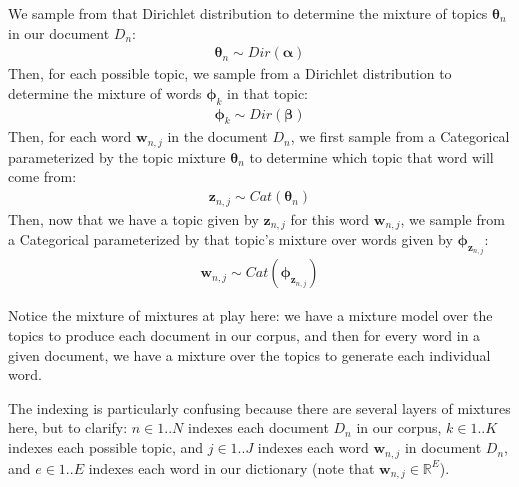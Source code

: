
We sample from that Dirichlet distribution to determine the mixture of topics $\boldsymbol{\theta}_n$ in our document $D_n$:
\begin{align*}
    \boldsymbol{\theta}_n \sim Dir(\boldsymbol{\alpha})
\end{align*}
Then, for each possible topic, we sample from a Dirichlet distribution to determine the mixture of words $\boldsymbol{\phi}_k$ in that topic:
\begin{align*}
    \boldsymbol{\phi}_k \sim Dir(\boldsymbol{\beta})
\end{align*}
Then, for each word $\textbf{w}_{n, j}$ in the document $D_n$, we first sample from a Categorical parameterized by the topic mixture $\boldsymbol{\theta}_n$ to determine which topic that word will come from:
\begin{align*}
    \textbf{z}_{n, j} \sim Cat(\boldsymbol{\theta}_n)
\end{align*}
Then, now that we have a topic given by $\textbf{z}_{n, j}$ for this word $\textbf{w}_{n, j}$, we sample from a Categorical parameterized by that topic's mixture over words given by $\boldsymbol{\phi}_{\textbf{z}_{n, j}}$:
\begin{align*}
    \textbf{w}_{n, j} \sim Cat(\boldsymbol{\phi}_{\textbf{z}_{n, j}})
\end{align*}

Notice the mixture of mixtures at play here: we have a mixture model over the topics to produce each document in our corpus, and then for every word in a given document, we have a mixture over the topics to generate each individual word.

The indexing is particularly confusing because there are several layers of mixtures here, but to clarify: $n \in 1..N$ indexes each document $D_n$ in our corpus, $k \in 1..K$ indexes each possible topic, and $j \in 1..J$ indexes each word $\textbf{w}_{n,j}$ in document $D_n$, and $e \in 1..E$ indexes each word in our dictionary (note that $\textbf{w}_{n,j} \in \mathbb{R}^{E}$).

